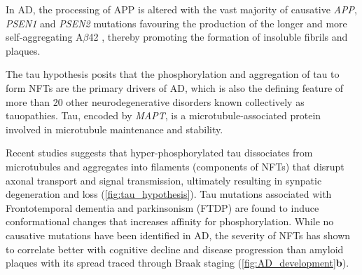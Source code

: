 In AD, the processing of APP is altered with the vast majority of causative \textit{APP}, \textit{PSEN1} and \textit{PSEN2} mutations favouring the production of the longer and more self-aggregating A$\beta$42 \cite{Li2019,D1996,JT1993}, thereby promoting the formation of insoluble fibrils and plaques\cite{JT1993}. 





The tau hypothesis posits that the phosphorylation and aggregation of tau to form NFTs are the primary drivers of AD\cite{KS1986}, which is also the defining feature of more than 20 other neurodegenerative disorders known collectively as tauopathies\cite{Orr2017}. Tau, encoded by \textit{MAPT}, is a microtubule-associated protein involved in microtubule maintenance and stability. 

Recent studies suggests that hyper-phosphorylated tau dissociates from microtubules and aggregates into filaments\cite{Grundke-Iqbal1986,Grundke-Iqbal1986a} (components of NFTs) that disrupt axonal transport and signal transmission, ultimately resulting in synpatic degeneration and loss\cite{Coomans2021} (\cref{fig:tau_hypothesis}).  Tau mutations associated with Frontotemporal dementia and parkinsonism (FTDP)  are found to induce conformational changes that increases affinity for phosphorylation\cite{Alonso2004}. While no causative mutations have been identified in AD, the severity of NFTs has shown to correlate better with cognitive decline and disease progression than amyloid plaques \cite{Serrano-Pozo2016,Giannakopoulos2003,PV1992} with its spread traced through Braak staging \cite{H1991} (\cref{fig:AD_development}\textbf{b}).

